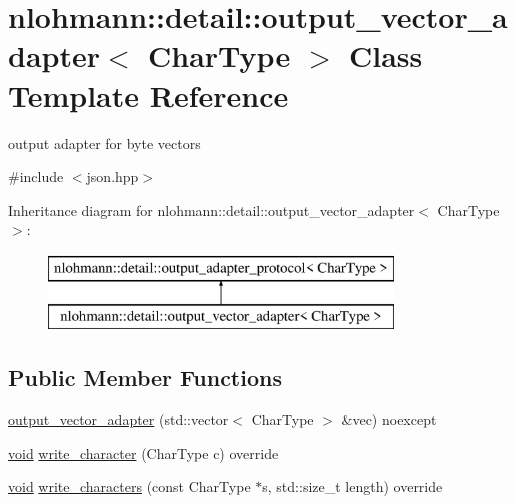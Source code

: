 \hypertarget{classnlohmann_1_1detail_1_1output__vector__adapter}{}\section{nlohmann\+::detail\+::output\+\_\+vector\+\_\+adapter$<$ Char\+Type $>$ Class Template Reference}
\label{classnlohmann_1_1detail_1_1output__vector__adapter}


output adapter for byte vectors  




{\ttfamily \#include $<$json.\+hpp$>$}

Inheritance diagram for nlohmann\+::detail\+::output\+\_\+vector\+\_\+adapter$<$ Char\+Type $>$\+:\begin{figure}[H]
\begin{center}
\leavevmode
\includegraphics[height=2.000000cm]{d5/d66/classnlohmann_1_1detail_1_1output__vector__adapter}
\end{center}
\end{figure}
\subsection*{Public Member Functions}
\begin{DoxyCompactItemize}
\item 
\mbox{\hyperlink{classnlohmann_1_1detail_1_1output__vector__adapter_a9c4fbf88fda356837038ec30a264cd3e}{output\+\_\+vector\+\_\+adapter}} (std\+::vector$<$ Char\+Type $>$ \&vec) noexcept
\item 
\mbox{\hyperlink{namespacenlohmann_1_1detail_a59fca69799f6b9e366710cb9043aa77d}{void}} \mbox{\hyperlink{classnlohmann_1_1detail_1_1output__vector__adapter_af6a22d4210bb7bc2da66021300ddd6db}{write\+\_\+character}} (Char\+Type c) override
\item 
\mbox{\hyperlink{namespacenlohmann_1_1detail_a59fca69799f6b9e366710cb9043aa77d}{void}} \mbox{\hyperlink{classnlohmann_1_1detail_1_1output__vector__adapter_ad6f6c461dec7bedd5359454dc22fc9aa}{write\+\_\+characters}} (const Char\+Type $\ast$s, std\+::size\+\_\+t length) override
\end{DoxyCompactItemize}
